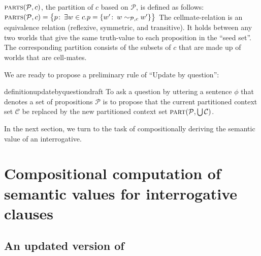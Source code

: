 \a $\textsc{parts}(\mathcal{P},c)$, the partition of $c$ based on $\mathcal{P}$,
is defined as
follows:\\
$\textsc{parts}(\mathcal{P},c) = \bigl\{p\co \exists w\in c. p = \{w'\co w \sim_{\mathcal{P},c} w'\}\bigr\}$
\xe
%
The cellmate-relation is an equivalence relation (reflexive, symmetric, and
transitive). It holds between any two worlds that give the same truth-value to
each proposition in the ``seed set''. The corresponding partition consists of
the subsets of $c$ that are made up of worlds that are cell-mates.

We are ready to propose a preliminary rule of ``Update by question'':

\begin{restatable}{definition}{updatebyquestiondraft}%
  \label{def:update-by-question-draft}%
  To ask a question by uttering a sentence $\phi$ that denotes a set of
  propositions $\mathcal{P}$ is to propose that the current partitioned context
  set $\mathcal{C}$ be replaced by the new partitioned context set
  $\textsc{part}(\mathcal{P},\bigcup \mathcal{C})$.
\end{restatable}

In the next section, we turn to the task of compositionally deriving the
semantic value of an interrogative.

\clearpage
\section{Compositional computation of semantic values for interrogative clauses}
\label{sec:compositional-interrogative}

\subsection{An updated version of \cite{karttunen-1977-questions}}%
\label{sec:karttunen-1977}

